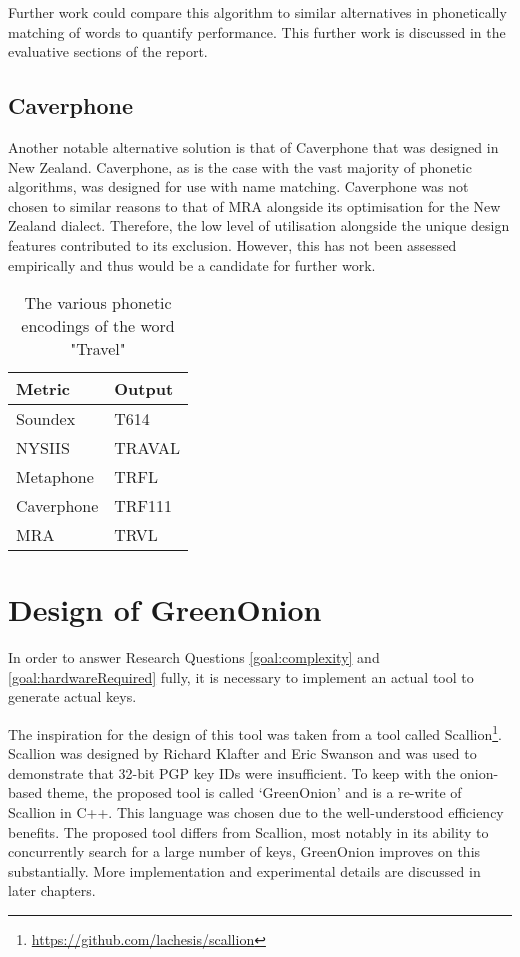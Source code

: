 Further work could compare this algorithm to similar alternatives in phonetically matching of words to quantify performance. This further work is discussed in the evaluative sections of the report.

\subsection{Caverphone}
Another notable alternative solution is that of Caverphone that was designed in New Zealand. Caverphone, as is the case with the vast majority of phonetic algorithms, was designed for use with name matching. Caverphone was not chosen to similar reasons to that of MRA alongside its optimisation for the New Zealand dialect. Therefore, the low level of utilisation alongside the unique design features contributed to its exclusion. However, this has not been assessed empirically and thus would be a candidate for further work.

\begin{table}[h!]
    \centering
    \begin{tabular}{ll}
        Metric & Output \\
        \hline    
        Soundex & T614 \\
        NYSIIS & TRAVAL\\
        Metaphone & TRFL\\
        Caverphone & TRF111\\
        MRA & TRVL
    \end{tabular}
    \caption{The various phonetic encodings of the word "Travel"}
\end{table}

\section{Design of GreenOnion}
\label{sec:greenDesign}
In order to answer Research Questions \ref{goal:complexity} and \ref{goal:hardwareRequired} fully, it is necessary to implement an actual tool to generate actual keys. 

The inspiration for the design of this tool was taken from a tool called Scallion\footnote{\url{https://github.com/lachesis/scallion}}. Scallion was designed by Richard Klafter and Eric Swanson and was used to demonstrate that 32-bit PGP key IDs were insufficient. To keep with the onion-based theme, the proposed tool is called `GreenOnion' and is a re-write of Scallion in C++. This language was chosen due to the well-understood efficiency benefits. The proposed tool differs from Scallion, most notably in its ability to concurrently search for a large number of keys, GreenOnion improves on this substantially. More implementation and experimental details are discussed in later chapters.

